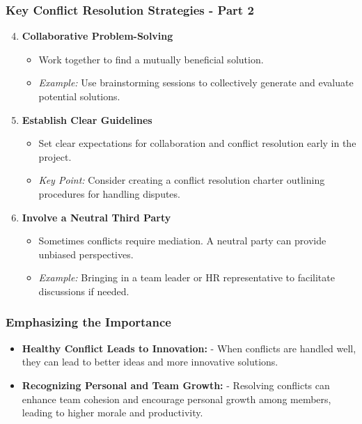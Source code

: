 \documentclass[aspectratio=169]{beamer}
\begin{document}
\begin{frame}[fragile]
    \frametitle{Key Conflict Resolution Strategies - Part 2}
    \begin{enumerate}
        \setcounter{enumi}{3} %
        \item \textbf{Collaborative Problem-Solving}
            \begin{itemize}
                \item Work together to find a mutually beneficial solution.
                \item \textit{Example:} Use brainstorming sessions to collectively generate and evaluate potential solutions.
            \end{itemize}
        \item \textbf{Establish Clear Guidelines}
            \begin{itemize}
                \item Set clear expectations for collaboration and conflict resolution early in the project.
                \item \textit{Key Point:} Consider creating a conflict resolution charter outlining procedures for handling disputes.
            \end{itemize}
        \item \textbf{Involve a Neutral Third Party}
            \begin{itemize}
                \item Sometimes conflicts require mediation. A neutral party can provide unbiased perspectives.
                \item \textit{Example:} Bringing in a team leader or HR representative to facilitate discussions if needed.
            \end{itemize}
    \end{enumerate}
\end{frame}

\begin{frame}[fragile]
    \frametitle{Emphasizing the Importance}
    \begin{itemize}
        \item \textbf{Healthy Conflict Leads to Innovation:} 
            - When conflicts are handled well, they can lead to better ideas and more innovative solutions.
        \item \textbf{Recognizing Personal and Team Growth:}
            - Resolving conflicts can enhance team cohesion and encourage personal growth among members, leading to higher morale and productivity.
    \end{itemize}
\end{frame}
\end{document}
